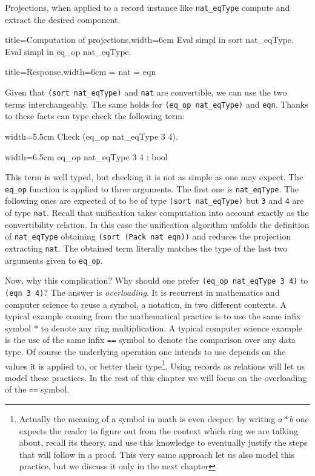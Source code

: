 Projections, when applied to a record instance like
\lstinline/nat_eqType/ compute and extract the desired component.

\begin{coq}{title=Computation of projections,width=6cm}
Eval simpl in sort nat_eqType.
Eval simpl in eq_op nat_eqType.
\end{coq}
\begin{coqout}{title=Response,width=6cm}
 = nat
 = eqn
\end{coqout}

Given that \lstinline/(sort nat_eqType)/ and \lstinline/nat/
are convertible, we can use the two terms interchangeably.
The same holds for \lstinline/(eq_op nat_eqType)/ and \lstinline/eqn/.
Thanks to these facts \Coq{} can type check the following term:

\begin{coq}{width=5.5cm}
Check (eq_op nat_eqType 3 4).
\end{coq}
\begin{coqout}{width=6.5cm}
eq_op nat_eqType 3 4 : bool
\end{coqout}

This term is well typed, but checking it is not as simple as one may
expect.
The \lstinline/eq_op/ function is applied to three arguments.
The first one is \lstinline/nat_eqType/.  The following ones
are expected of to be of type \lstinline/(sort nat_eqType)/
but \lstinline/3/ and \lstinline/4/ are of type \lstinline/nat/.
Recall that unification takes computation into account exactly as the
convertibility relation.  In this case the unification algorithm
unfolds the definition of \lstinline/nat_eqType/ obtaining
\lstinline/(sort (Pack nat eqn))/ and reduces the projection
extracting  \lstinline/nat/.  The obtained term literally matches the
type of the last two arguments given to \lstinline/eq_op/.

Now, why this complication?  Why should one prefer
\lstinline/(eq_op nat_eqType 3 4)/ to \lstinline/(eqn 3 4)/?
The answer is \emph{overloading}.
It is recurrent in mathematics and computer science to reuse
a symbol, a notation, in two different contexts.  A typical
example coming from the mathematical practice is to use the same
infix symbol $*$ to denote any ring multiplication.  A typical
computer science example is the use of the same infix
\lstinline/==/ symbol to denote the comparison over any data type.
Of course the underlying operation one intends to use depends on
the values it is applied to, or better their type\footnote{
Actually the meaning of a symbol in math is even deeper: by writing $a
* b$ one expects the reader to figure out from the context which ring
we are talking about, recall its theory, and use this knowledge to
eventually justify the steps that will follow in a proof.  This very
same approach let us also model this practice, but we discuss it only
in the next chapter}.
Using records as relations will let us model these practices.  In the
rest of this chapter we will focus on the overloading of the
\lstinline/==/ symbol.

